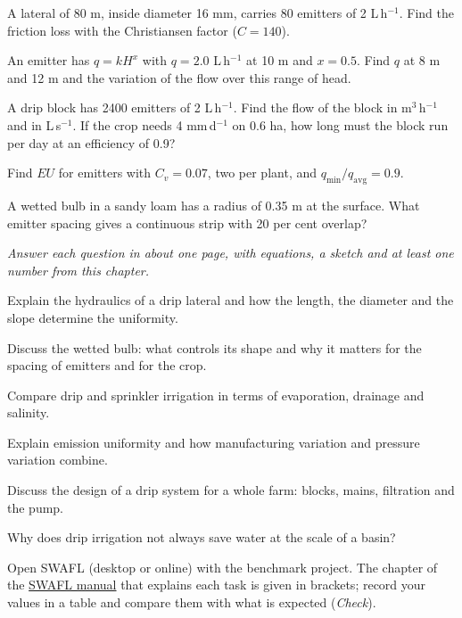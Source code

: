 \begin{exlist}
\item A lateral of 80 m, inside diameter 16 mm, carries 80 emitters of 2 L\,h$^{-1}$. Find the friction loss with the Christiansen factor ($C=140$).
\item An emitter has $q=kH^{x}$ with $q=2.0$ L\,h$^{-1}$ at 10 m and $x=0.5$. Find $q$ at 8 m and 12 m and the variation of the flow over this range of head.
\item A drip block has 2400 emitters of 2 L\,h$^{-1}$. Find the flow of the block in m$^3$\,h$^{-1}$ and in L\,s$^{-1}$. If the crop needs 4 mm\,d$^{-1}$ on 0.6 ha, how long must the block run per day at an efficiency of 0.9?
\item Find $EU$ for emitters with $C_v=0.07$, two per plant, and $q_{\min}/q_{\mathrm{avg}}=0.9$.
\item A wetted bulb in a sandy loam has a radius of 0.35 m at the surface. What emitter spacing gives a continuous strip with 20 per cent overlap?
\end{exlist}
{\small\itshape Answer each question in about one page, with equations, a sketch and at least one number from this chapter.}\par\vspace{3pt}
\begin{exlist}
\item Explain the hydraulics of a drip lateral and how the length, the diameter and the slope determine the uniformity.
\item Discuss the wetted bulb: what controls its shape and why it matters for the spacing of emitters and for the crop.
\item Compare drip and sprinkler irrigation in terms of evaporation, drainage and salinity.
\item Explain emission uniformity and how manufacturing variation and pressure variation combine.
\item Discuss the design of a drip system for a whole farm: blocks, mains, filtration and the pump.
\item Why does drip irrigation not always save water at the scale of a basin?
\end{exlist}
{\small Open SWAFL (desktop or online) with the benchmark project. The chapter of the \href{https://github.com/halilunaziru73-creator/Coupled-Water-Fluxes-Pore-Scale-Dynamics-Precision-Irrigation-Mulching-Feedback-Loops/raw/main/Software/v1.1.0/SWAFL_Desktop/docs/manual_v1.1.0/SWAFL_Manual_v1.1.0.pdf}{SWAFL manual} that explains each task is given in brackets; record your values in a table and compare them with what is expected (\emph{Check}).}\par\vspace{3pt}
